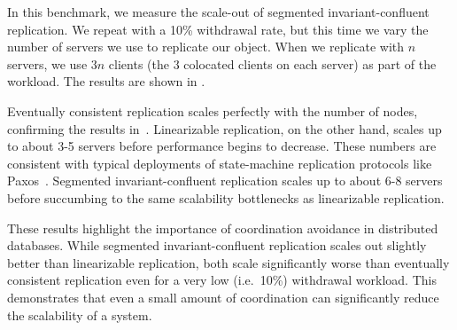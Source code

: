 \begin{benchmark}
  In this benchmark, we measure the scale-out of segmented invariant-confluent
  replication. We repeat  with a 10\% withdrawal rate,
  but this time we vary the number of servers we use to replicate our object.
  When we replicate with $n$ servers, we use $3n$ clients (the $3$ colocated
  clients on each server) as part of the workload. The results are shown in
  .

  Eventually consistent replication scales perfectly with the number of nodes,
  confirming the results in~\cite{bailis2014coordination}.
  Linearizable replication, on the other hand, scales up to about 3-5 servers
  before performance begins to decrease. These numbers are consistent with
  typical deployments of state-machine replication protocols like
  Paxos~\cite{chandra2007paxos}.
  Segmented invariant-confluent replication scales up to about 6-8 servers
  before succumbing to the same scalability bottlenecks as linearizable
  replication.

  These results highlight the importance of coordination avoidance in
  distributed databases. While segmented invariant-confluent replication scales
  out slightly better than linearizable replication, both scale significantly
  worse than eventually consistent replication even for a very low (i.e.\ 10\%)
  withdrawal workload. This demonstrates that even a small amount of
  coordination can significantly reduce the scalability of a system.
\end{benchmark}
